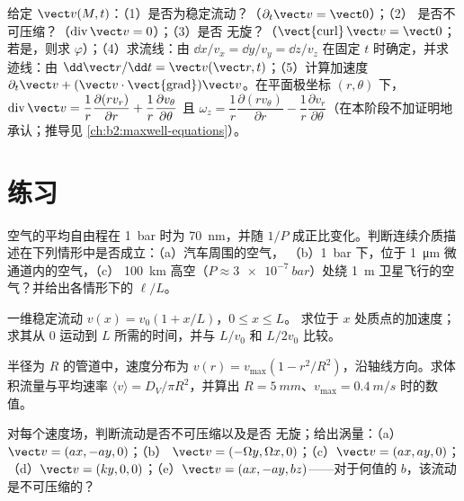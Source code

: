 \begin{method}[读取速度场]\label{met:b2:fluid-kinematics:reading}
给定 $\vect v(M, t)$：（1）是否为稳定流动？（$\partial_t\vect v = \vect 0$）；（2）
是否不可压缩？（$\operatorname{div}\vect v = 0$）；（3）是否
无旋？（$\operatorname{\vect{curl}}\vect v = \vect 0$；若是，则求
$\varphi$）；（4）求流线：由 $\dd x/v_x = \dd y/v_y = \dd z/
v_z$ 在固定 $t$ 时确定，并求迹线：由 $\dd\vect r/\dd t = \vect v(\vect r,
t)$；（5）计算加速度 $\partial_t\vect v + (\vect v\cdot
\operatorname{\vect{grad}})\vect v$。在平面极坐标 $(r, \theta)$ 下，
$\operatorname{div}\vect v = \dfrac1r\dfrac{\partial(rv_r)}{\partial r} + \dfrac1r
\dfrac{\partial v_\theta}{\partial\theta}$ 且 $\omega_z = \dfrac1r\dfrac{\partial(rv_\theta)}
{\partial r} - \dfrac1r\dfrac{\partial v_r}{\partial\theta}$（在本阶段不加证明地承认；推导见
\cref{ch:b2:maxwell-equations}）。
\end{method}

\section{练习}

\begin{exercise}[$\star$]\label{exo:b2:fluid-kinematics:1}
空气的平均自由程在 \qty{1}{bar} 时为 \qty{70}{nm}，并随
$1/P$ 成正比变化。判断连续介质描述在下列情形中是否成立：（a）汽车周围的空气，
（b）\qty{1}{bar} 下，位于 \qty{1}{\micro m} 微通道内的空气，（c）
\qty{100}{km} 高空（$P \approx \qty{3e-7}{bar}$）处绕
\qty{1}{m} 卫星飞行的空气？并给出各情形下的 $\ell/L$。
\end{exercise}

\begin{exercise}[$\star$]\label{exo:b2:fluid-kinematics:2}
一维稳定流动 $v(x) = v_0(1 + x/L)$，$0 \le x \le L$。
求位于 $x$ 处质点的加速度；求其从 $0$ 运动到
$L$ 所需的时间，并与 $L/v_0$ 和 $L/2v_0$ 比较。
\end{exercise}

\begin{exercise}[$\star$]\label{exo:b2:fluid-kinematics:3}
半径为 $R$ 的管道中，速度分布为 $v(r) = v_{\max}(1 -
r^2/R^2)$，沿轴线方向。求体积流量与平均速率 $\langle v\rangle
= D_V/\pi R^2$，并算出 $R = \qty{5}{mm}$、$v_{\max} = \qty{0.4}{m/s}$ 时的数值。
\end{exercise}

\begin{exercise}[$\star$]\label{exo:b2:fluid-kinematics:4}
对每个速度场，判断流动是否不可压缩以及是否
无旋；给出涡量：（a）$\vect v = (ax, -ay, 0)$；（b）
$\vect v = (-\Omega y, \Omega x, 0)$；（c）$\vect v = (ax, ay, 0)$；（d）$\vect v =
(ky, 0, 0)$；（e）$\vect v = (ax, -ay, bz)$——对于何值的 $b$，该流动
是不可压缩的？
\end{exercise}

